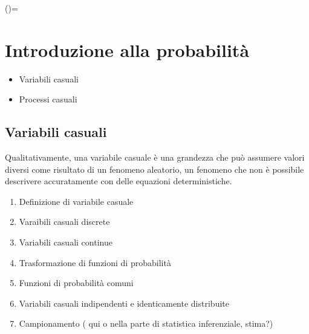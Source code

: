 \documentclass[letterpaper,10pt,italian]{jupyterBook}
\begin{document}
\sphinxAtStartPar
()=


\chapter{Introduzione alla probabilità}
\label{\detokenize{ch/statistics/probability:introduzione-alla-probabilita}}\label{\detokenize{ch/statistics/probability::doc}}\begin{itemize}
\item {} 
\sphinxAtStartPar
Variabili casuali

\item {} 
\sphinxAtStartPar
Processi casuali

\end{itemize}

\sphinxstepscope


\section{Variabili casuali}
\label{\detokenize{ch/statistics/random_variables:variabili-casuali}}\label{\detokenize{ch/statistics/random_variables:statistics-hs-random-variables}}\label{\detokenize{ch/statistics/random_variables::doc}}
\sphinxAtStartPar
Qualitativamente, una variabile casuale è una grandezza che può assumere valori diversi come risultato di un fenomeno aleatorio, un fenomeno che non è possibile descrivere accuratamente con delle equazioni deterministiche.  

\sphinxAtStartPar
{}
\begin{enumerate}
%
\item {} 
\sphinxAtStartPar
Definizione di variabile casuale

\item {} 
\sphinxAtStartPar
Varaibili casuali discrete

\item {} 
\sphinxAtStartPar
Variabili casuali continue

\item {} 
\sphinxAtStartPar
Trasformazione di funzioni di probabilità

\item {} 
\sphinxAtStartPar
Funzioni di probabilità comuni

\item {} 
\sphinxAtStartPar
Variabili casuali indipendenti e identicamente distribuite

\item {} 
\sphinxAtStartPar
Campionamento ( qui o nella parte di statistica inferenziale, stima?)

\end{enumerate}
\end{document}

